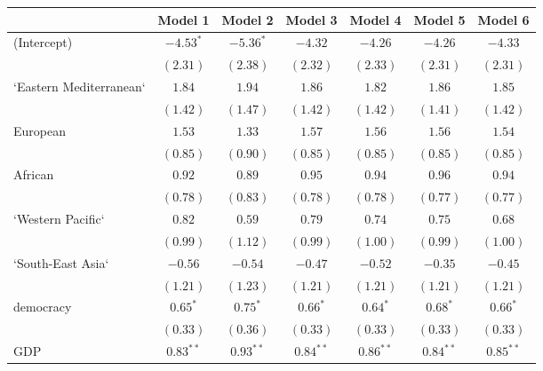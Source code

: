 
\begin{table}[!h]
\begin{center}
\begin{tabular}{l c c c c c c }
\toprule
 & Model 1 & Model 2 & Model 3 & Model 4 & Model 5 & Model 6 \\
\midrule
(Intercept)             & $-4.53^{*}$  & $-5.36^{*}$  & $-4.32$      & $-4.26$      & $-4.26$      & $-4.33$      \\
                        & $(2.31)$     & $(2.38)$     & $(2.32)$     & $(2.33)$     & $(2.31)$     & $(2.31)$     \\
`Eastern Mediterranean` & $1.84$       & $1.94$       & $1.86$       & $1.82$       & $1.86$       & $1.85$       \\
                        & $(1.42)$     & $(1.47)$     & $(1.42)$     & $(1.42)$     & $(1.41)$     & $(1.42)$     \\
European                & $1.53$       & $1.33$       & $1.57$       & $1.56$       & $1.56$       & $1.54$       \\
                        & $(0.85)$     & $(0.90)$     & $(0.85)$     & $(0.85)$     & $(0.85)$     & $(0.85)$     \\
African                 & $0.92$       & $0.89$       & $0.95$       & $0.94$       & $0.96$       & $0.94$       \\
                        & $(0.78)$     & $(0.83)$     & $(0.78)$     & $(0.78)$     & $(0.77)$     & $(0.77)$     \\
`Western Pacific`       & $0.82$       & $0.59$       & $0.79$       & $0.74$       & $0.75$       & $0.68$       \\
                        & $(0.99)$     & $(1.12)$     & $(0.99)$     & $(1.00)$     & $(0.99)$     & $(1.00)$     \\
`South-East Asia`       & $-0.56$      & $-0.54$      & $-0.47$      & $-0.52$      & $-0.35$      & $-0.45$      \\
                        & $(1.21)$     & $(1.23)$     & $(1.21)$     & $(1.21)$     & $(1.21)$     & $(1.21)$     \\
democracy               & $0.65^{*}$   & $0.75^{*}$   & $0.66^{*}$   & $0.64^{*}$   & $0.68^{*}$   & $0.66^{*}$   \\
                        & $(0.33)$     & $(0.36)$     & $(0.33)$     & $(0.33)$     & $(0.33)$     & $(0.33)$     \\
GDP                     & $0.83^{**}$  & $0.93^{**}$  & $0.84^{**}$  & $0.86^{**}$  & $0.84^{**}$  & $0.85^{**}$  \\

\end{tabular}
\end{center}
\end{table}
